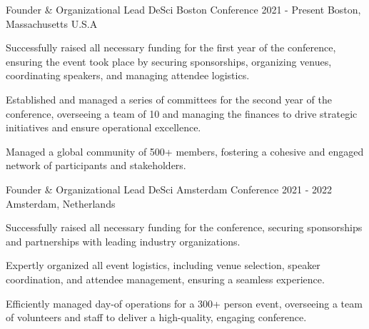 

\begin{cventries}

  \cventry
    {Founder \& Organizational Lead} %
    {DeSci Boston Conference} %
    {2021 - Present} %
    {Boston, Massachusetts U.S.A} %
    {
      \begin{cvitems} %
        \item {Successfully raised all necessary funding for the first year of the conference, ensuring the event took place by securing sponsorships, organizing venues, coordinating speakers, and managing attendee logistics.}
        \item {Established and managed a series of committees for the second year of the conference, overseeing a team of 10 and managing the finances to drive strategic initiatives and ensure operational excellence.}
        \item {Managed a global community of 500+ members, fostering a cohesive and engaged network of participants and stakeholders.}
      \end{cvitems}
    }


  \cventry
    {Founder \& Organizational Lead} %
    {DeSci Amsterdam Conference} %
    {2021 - 2022} %
    {Amsterdam, Netherlands} %
    {
      \begin{cvitems} %
        \item {Successfully raised all necessary funding for the conference, securing sponsorships and partnerships with leading industry organizations.}
        \item {Expertly organized all event logistics, including venue selection, speaker coordination, and attendee management, ensuring a seamless experience.}
        \item {Efficiently managed day-of operations for a 300+ person event, overseeing a team of volunteers and staff to deliver a high-quality, engaging conference.}
      \end{cvitems}
    }


\end{cventries}
